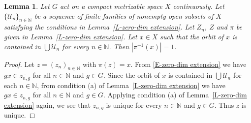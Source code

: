\documentclass[11pt]{amsart}
\newtheorem{lemma}[theorem]{Lemma}
\theoremstyle{definition}
\numberwithin{equation}{section}
\theoremstyle{definition}
\newcommand{\cU}{{\mathcal U}}
\newcommand{\Nb}{{\mathbb N}}
\begin{document}
\begin{lemma} \label{L-unique preimage}
Let $G$ act on a compact metrizable space $X$ continuously. Let $\{\cU_n\}_{n\in \Nb}$ be a sequence of finite families of nonempty open subsets of $X$ satisfying the conditions in Lemma~\ref{L-zero-dim extension}. Let $Z_n$, $Z$ and $\pi$ be given in Lemma~\ref{L-zero-dim extension}. Let $x\in X$ such that the orbit of $x$ is contained in $\bigcup \cU_n$ for every $n\in \Nb$. Then $|\pi^{-1}(x)|=1$.
\end{lemma}
\begin{proof} Let $z=(z_n)_{n\in \Nb}$ with $\pi(z)=x$. From \eqref{E-zero-dim extension} we have $gx\in \overline{z_{n, g}}$ for all $n\in \Nb$ and $g\in G$. Since the orbit of $x$ is contained in $\bigcup \cU_n$ for each $n\in \Nb$, from condition (a) of Lemma~\ref{L-zero-dim extension} we have $gx\in z_{n, g}$ for all $n\in \Nb$ and $g\in G$. Applying condition (a) of Lemma~\ref{L-zero-dim extension} again,  we see that $z_{n, g}$ is unique for every $n\in \Nb$ and $g\in G$. Thus $z$ is unique.  
\end{proof}
\end{document}
